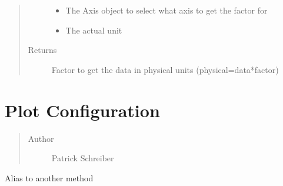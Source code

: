 \documentclass[letterpaper,10pt,openany,oneside,english]{sphinxmanual}
\begin{document}
\begin{fulllineitems}
\begin{fulllineitems}
\begin{quote}
\begin{description}
\begin{itemize}
\item {} 
 \textendash{} The Axis object to select what axis to get the factor for

\item {} 
 \textendash{} The actual unit

\end{itemize}

\item[{Returns}] \leavevmode
Factor to get the data in physical units (physical=data*factor)

\end{description}\end{quote}

\end{fulllineitems}


\end{fulllineitems}

\label{\detokenize{config:module-config}}

\chapter{Plot Configuration}
\label{\detokenize{config:config}}\label{\detokenize{config:plot-configuration}}\label{\detokenize{config::doc}}\begin{quote}\begin{description}
\item[{Author}] \leavevmode
Patrick Schreiber

\end{description}\end{quote}

\begin{fulllineitems}
\label{\detokenize{config:config.Alias}}
Alias to another method

\end{fulllineitems}


\begin{fulllineitems}
\label{\detokenize{config:config.update_line_color}}
\end{fulllineitems}
\end{document}
